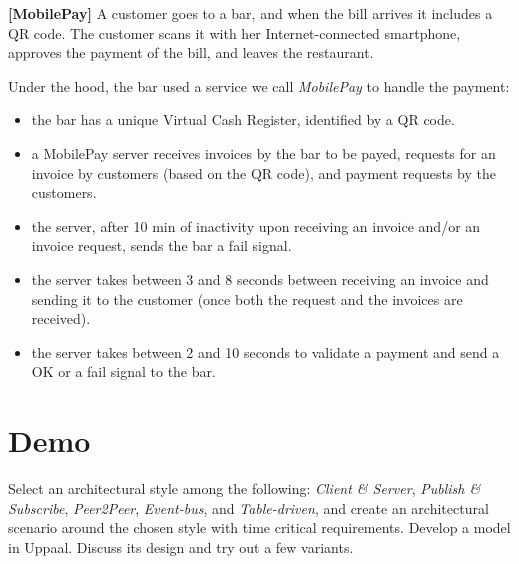 \documentclass[11pt]{article}
\begin{document}
\begin{exercise} \label{ex:vm2}
\textbf{[MobilePay]}
A customer goes to a bar, and when the bill arrives it includes a QR code. The customer scans it with her Internet-connected smartphone, approves the payment of the bill, and leaves the restaurant.

Under the hood, the bar used a service we call \emph{MobilePay} to handle the payment: %
\begin{itemize}
  \setlength\itemsep{0.3mm}
  \item the bar has a unique Virtual Cash Register, identified by a QR code.
  \item a MobilePay server receives invoices by the bar to be payed, requests for an invoice by customers (based on the QR code), and payment requests by the customers.
  \item the server, after 10 min of inactivity upon receiving an invoice and/or an invoice request, sends the bar a fail signal.
  \item the server takes between 3 and 8 seconds between receiving an invoice and sending it to the customer (once both the request and the invoices are received).
  \item the server takes between 2 and 10 seconds to validate a payment and send a OK or a fail signal to the bar.
\end{itemize}





\end{exercise}

\section*{Demo}


\begin{exercise}  
Select an architectural style among the following: \emph{Client \& Server}, \emph{Publish \& Subscribe}, \emph{Peer2Peer}, \emph{Event-bus}, and \emph{Table-driven}, and create an architectural scenario around the chosen style with time critical requirements. Develop a model in Uppaal. Discuss its design and try out a few variants.
\end{exercise}


 
\end{document}
